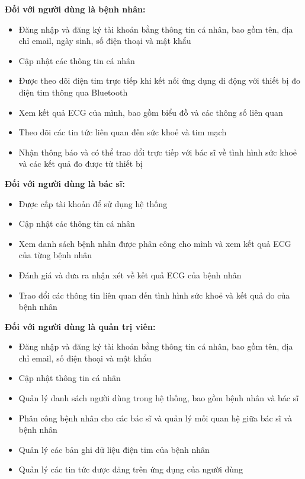 \textbf{Đối với người dùng là bệnh nhân:}
\begin{adjustwidth}{1.5em}{}
\begin{itemize}
    \item Đăng nhập và đăng ký tài khoản bằng thông tin cá nhân, bao gồm tên, địa chỉ email, ngày sinh, số điện thoại và mật khẩu
    \item Cập nhật các thông tin cá nhân
    \item Được theo dõi điện tim trực tiếp khi kết nối ứng dụng di động với thiết bị đo điện tim thông qua Bluetooth
    \item Xem kết quả ECG của mình, bao gồm biểu đồ và các thông số liên quan
    \item Theo dõi các tin tức liên quan đến sức khoẻ và tim mạch
    \item Nhận thông báo và có thể trao đổi trực tiếp với bác sĩ về tình hình sức khoẻ và các kết quả đo được từ thiết bị
\end{itemize}
\end{adjustwidth}
\textbf{Đối với người dùng là bác sĩ:}
\begin{adjustwidth}{1.5em}{}
\begin{itemize}
    \item Được cấp tài khoản để sử dụng hệ thống
    \item Cập nhật các thông tin cá nhân
    \item Xem danh sách bệnh nhân được phân công cho mình và xem kết quả ECG của từng bệnh nhân
    \item Đánh giá và đưa ra nhận xét về kết quả ECG của bệnh nhân
    \item Trao đổi các thông tin liên quan đến tình hình sức khoẻ và kết quả đo của bệnh nhân
\end{itemize}
\end{adjustwidth}
\textbf{Đối với người dùng là quản trị viên:}
\begin{adjustwidth}{1.5em}{}
\begin{itemize}
    \item Đăng nhập và đăng ký tài khoản bằng thông tin cá nhân, bao gồm tên, địa chỉ email, số điện thoại và mật khẩu
    \item Cập nhật thông tin cá nhân
    \item Quản lý danh sách người dùng trong hệ thống, bao gồm bệnh nhân và bác sĩ
    \item Phân công bệnh nhân cho các bác sĩ và quản lý mối quan hệ giữa bác sĩ và bệnh nhân
    \item Quản lý các bản ghi dữ liệu điện tim của bệnh nhân
    \item Quản lý các tin tức được đăng trên ứng dụng của người dùng
\end{itemize}
\end{adjustwidth}
